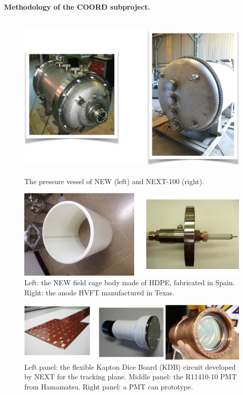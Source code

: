 \paragraph{Methodology of the COORD subproject.}

\begin{figure}
\centering
\includegraphics[height=8cm]{img/PV.jpg}
\caption{\small The pressure vessel of NEW (left) and NEXT-100 (right).} \label{fig:PV}
\end{figure}

\begin{figure}[t!b!]
\begin{center}
\includegraphics[width=.9\textwidth]{img/FC3.jpg}
\end{center}
\caption{\small Left: the NEW field cage body made of HDPE, fabricated in Spain. Right: the anode HVFT manufactured in Texas.
} \label{fig:FC}
\end{figure}

\begin{figure}[t!b!]
\begin{center}
\includegraphics[width=.9\textwidth]{img/KDBandPMT.jpg}
\end{center}
\caption{\small Left panel: the flexible Kapton Dice Board (KDB) circuit developed by NEXT for the tracking plane. Middle panel: the R11410-10 PMT from Hamamatsu. Right panel: a PMT can prototype.} \label{fig:sensors}
\end{figure}

